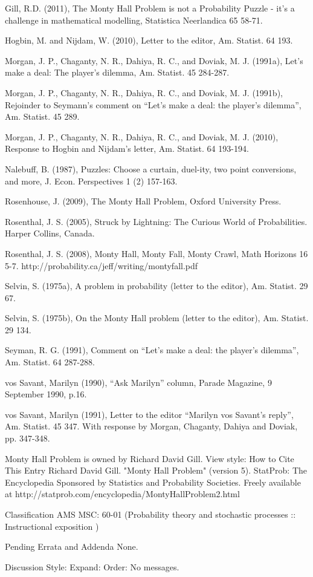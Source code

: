 Gill, R.D. (2011), The Monty Hall Problem is not a Probability Puzzle - it's a challenge in mathematical modelling, Statistica Neerlandica 65 58-71.

Hogbin, M. and Nijdam, W. (2010), Letter to the editor, Am. Statist. 64 193.

Morgan, J. P., Chaganty, N. R., Dahiya, R. C., and Doviak, M. J. (1991a), Let's make a deal: The player's dilemma, Am. Statist. 45 284-287.

Morgan, J. P., Chaganty, N. R., Dahiya, R. C., and Doviak, M. J. (1991b), Rejoinder to Seymann's comment on ``Let's make a deal: the player's dilemma'', Am. Statist. 45 289.

Morgan, J. P., Chaganty, N. R., Dahiya, R. C., and Doviak, M. J. (2010), Response to Hogbin and Nijdam's letter, Am. Statist. 64 193-194.

Nalebuff, B. (1987), Puzzles: Choose a curtain, duel-ity, two point conversions, and more, J. Econ. Perspectives 1 (2) 157-163.

Rosenhouse, J. (2009), The Monty Hall Problem, Oxford University Press.

Rosenthal, J. S. (2005), Struck by Lightning: The Curious World of Probabilities. Harper Collins, Canada.

Rosenthal, J. S. (2008), Monty Hall, Monty Fall, Monty Crawl, Math Horizons 16 5-7. http://probability.ca/jeff/writing/montyfall.pdf

Selvin, S. (1975a), A problem in probability (letter to the editor), Am. Statist. 29 67.

Selvin, S. (1975b), On the Monty Hall problem (letter to the editor), Am. Statist. 29 134.

Seyman, R. G. (1991), Comment on ``Let's make a deal: the player's dilemma'', Am. Statist. 64 287-288.

vos Savant, Marilyn (1990), ``Ask Marilyn'' column, Parade Magazine, 9 September 1990, p.16.

vos Savant, Marilyn (1991), Letter to the editor ``Marilyn vos Savant's reply'', Am. Statist. 45 347. With response by Morgan, Chaganty, Dahiya and Doviak, pp. 347-348.



Monty Hall Problem is owned by Richard David Gill.
View style:   
How to Cite This Entry
Richard David Gill. "Monty Hall Problem" (version 5). StatProb: The Encyclopedia Sponsored by Statistics and Probability Societies. Freely available at http://statprob.com/encyclopedia/MontyHallProblem2.html

Classification
AMS MSC:	60-01 (Probability theory and stochastic processes :: Instructional exposition )

Pending Errata and Addenda
None.

Discussion
Style:  Expand:  Order:   
No messages.
